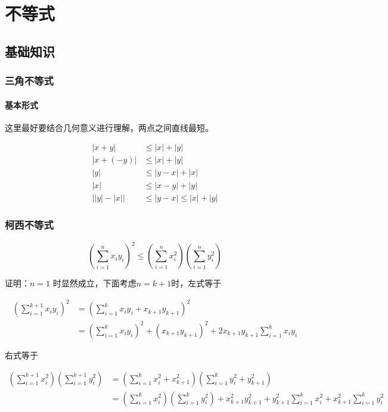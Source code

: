 \chapter{不等式}

\section{基础知识}

\subsection{三角不等式}

\subsubsection{基本形式}

这里最好要结合几何意义进行理解，两点之间直线最短。

\begin{align*}
\lvert x + y \rvert  & \le \lvert x \rvert + \lvert y \rvert \\
\lvert x + (- y) \rvert  & \le \lvert x \rvert + \lvert y \rvert \\
\lvert y \rvert & \le \lvert y -x \rvert + \lvert x \rvert \\
\lvert x \rvert & \le \lvert x - y \rvert + \lvert y \rvert \\
\lvert \lvert y \rvert - \lvert x \rvert \rvert & \le  \lvert y - x \rvert \le \lvert x \rvert + \lvert y \rvert
\end{align*}

\subsection{柯西不等式}

\[
(\sum_{i=1}^{n} x_i y_i)^2 \le (\sum_{i=1}^{n}x_i^2)(\sum_{i=1}^{n}y_i^2)
\]

证明：$n=1$ 时显然成立，下面考虑$n=k+1$时，左式等于

\begin{align*}
 (\sum_{i=1}^{k+1} x_i y_i)^2 &=   (\sum_{i=1}^{k} x_i y_i + x_{k+1}y_{k+1})^2 \\
 &= (\sum_{i=1}^{k} x_i y_i)^2 + (x_{k+1}y_{k+1})^2 + 2x_{k+1}y_{k+1}\sum_{i=1}^{k} x_i y_i
\end{align*}

右式等于

\begin{align*}
(\sum_{i=1}^{k+1}x_i^2)(\sum_{i=1}^{k+1}y_i^2) &= (\sum_{i=1}^{k}x_i^2 + x_{k+1}^2)(\sum_{i=1}^{k}y_i^2 + y_{k+1}^2) \\
&=(\sum_{i=1}^{k}x_i^2)(\sum_{i=1}^{k}y_i^2) + x_{k+1}^2y_{k+1}^2 + y_{k+1}^2\sum_{i=1}^{k}x_i^2 + x_{k+1}^2\sum_{i=1}^{k}y_i^2
\end{align*}


